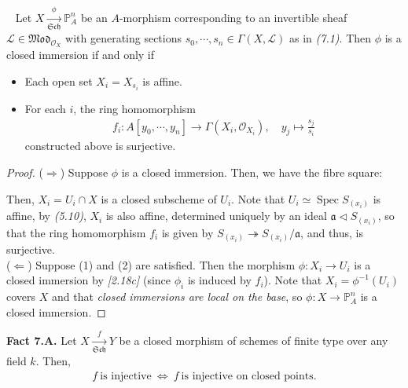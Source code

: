 \documentclass[11pt,a4paper,footinclude=true,headinclude=true]{scrbook} %
\DeclareMathOperator{\Spec}{Spec}
\newcommand{\LL}{\mathscr{L}}
\newcommand{\OO}{\mathcal{O}}
\newcommand{\PP}{\mathbb{P}}
\newcommand{\Sch}{\mathfrak{Sch}}
\newcommand{\<}{\langle}
\newcommand{\>}{\rangle}
\newcommand{\MOD}{\mathfrak{Mod}}
\newcommand\FibSq[2][\square]{%
  \arrow[mysymbol]{#2}[description]{#1}}
\newenvironment{proposition}[2][]
{\renewcommand\theinnercustomprop{#2}\innercustomprop[#1] 
\begin{mdframed}[backgroundcolor=gray!20]\ }
{\end{mdframed}\endinnercustomprop}
\newenvironment{fact}[2][Fact]
    { \begin{mdframed}[backgroundcolor=gray!20] \textbf{#1 #2.} }
    {  \end{mdframed}}
\begin{document}
\begin{proposition}{7.2}
    Let $X\xrightarrow[\Sch]{\phi}\PP_A^n$ be an $A$-morphism corresponding to an invertible sheaf $\LL\in\MOD_{\OO_X}$ with generating sections $s_0,\cdots,s_n\in\Gamma(X,\LL)$ as in \textit{(7.1)}. Then $\phi$ is a closed immersion if and only if
    \begin{itemize}
        \item[(1)] Each open set $X_i=X_{s_i}$ is affine. 
        \item[(2)] For each $i$, the ring homomorphism 
        \begin{align*}
            f_i:A[y_0,\cdots,y_n]\longrightarrow\Gamma(X_i,\OO_{X_i}),\quad y_j\longmapsto\frac{s_j}{s_i}
        \end{align*}
        constructed above is surjective.
    \end{itemize}
\end{proposition}
\begin{proof}
    ($\Rightarrow$) Suppose $\phi$ is a closed immersion. Then, we have the fibre square:
    \begin{center}
    \end{center}
    Then, $X_i=U_i\cap X$ is a closed subscheme of $U_i$. Note that $U_i\simeq\Spec S_{(x_i)}$ is affine, by \textit{(5.10)}, $X_i$ is also affine, determined uniquely by an ideal $\mathfrak{a}\triangleleft S_{(x_i)}$, so that the ring homomorphism $f_i$ is given by $S_{(x_i)}\twoheadrightarrow S_{(x_i)}/\mathfrak{a}$, and thus, is surjective.\\
    
    ($\Leftarrow$) Suppose (1) and (2) are satisfied. Then the morphism $\phi:X_i\to U_i$ is a closed immersion by \textit{[2.18c]} (since $\phi_i$ is induced by $f_i$). Note that $X_i=\phi^{-1}(U_i)$ covers $X$ and that \textit{closed immersions are local on the base}, so $\phi:X\to\PP_A^n$ is a closed immersion.
\end{proof}

\begin{fact}{7.A}
    Let $X\xrightarrow[\Sch]{f}Y$ be a closed morphism of schemes of finite type over any field $k$. Then,
    \begin{align*}
        f\ \text{is injective}\ \Longleftrightarrow\ f\ \text{is injective on closed points}.
    \end{align*}
\end{fact}
\end{document}
